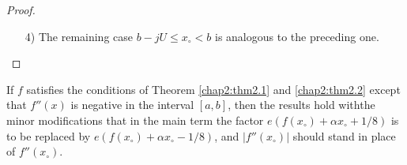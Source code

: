 \begin{proof}
\begin{enumerate}
Since\pageoriginale by \eqref{chap2:eq2.1.29}, \eqref{chap2:eq2.1.10},
and (iv)
\begin{align*}
& U^{-J}\int\limits_{-v}^v\left(U^J+|y|^J\right)|y|^\nu\exp\left(-2\pi
f''(x_\circ)y^2\right)\,dy\\
& \ll f''(x_\circ)^{-(\nu+1)/2}+U^{-J}f''(x_\circ)^{-(\nu+J+1)/2}\\
& \ll \mu(x_\circ)^{\nu+1}F(x_\circ)^{-(\nu+1)/2}
\end{align*}
the contribution of the error terms in \eqref{chap2:eq2.1.31} to $K_2$
is $\ll G(x_\circ)\break\mu(x_\circ)$ $F(x_\circ)^{-1}$. Hence
{\fontsize{10}{12}\selectfont
\begin{align*}
K_2 &= \sqrt{2}g(x_\circ)e(f(x_\circ)+\alpha x_\circ+1/8)U^{-J}
\int\limits_{-v}^v \left(x_\circ-a-jU+(1+i)y\right)^J\\
& \quad\exp\left(-2\pi f''(x_\circ)y^2\right)\,dy
+o\left(G(x_\circ)\mu(x_\circ)F(x_\circ)^{-1}\right)\\ 
&= \sqrt{2}g(x_\circ)e\left(f(x_\circ)+\alpha x_\circ+1/8\right)U^{-J}
\sum\limits_{0\leq\nu\leq J/2}(x_\circ-a-jU)^{J-2\nu}\times\\
&\qquad \times (1+i)^{2\nu}\binom{J}{2\nu}\int\limits_{-v}^vy^{2\nu}\exp
\left(-2\pi f''(x_\circ)y^2\right)\,dy\\
& \qquad +o\left(G(x_\circ)\mu(x_\circ) F(x_\circ)^{-1}\right). 
\end{align*}}

As before, the integrals here can be extended to the whole real line
with a negligible error. Then, evaluating the new integrals by
\eqref{chap2:eq2.1.29} we find that with 
$$
c_\nu=2^{-\nu}\pi^{-\nu-1/2}(1+i)^{2\nu}\binom{J}{2\nu}d_\nu
$$
and with $\xi(x_\circ)$ as in \eqref{chap2:eq2.1.13}, the resulting
expression for $I_J$ is as in \eqref{chap2:eq2.1.11}.
\item [4)] The remaining case $b-jU\leq x_\circ <b$ is analogous to
  the preceding one.
\end{enumerate}
\end{proof}

\begin{remark*}
If $f$ satisfies the conditions of Theorem \ref{chap2:thm2.1} and
\ref{chap2:thm2.2} except that $f''(x)$ is negative in the interval
$[a,b]$, then the results hold with\pageoriginale the minor
modifications that in the main term the factor $e(f(x_\circ)+\alpha
x_\circ +1/8)$ is to be replaced by $e(f(x_\circ)+\alpha x_\circ
-1/8)$, and $|f''(x_\circ)|$ should stand in place of $f''(x_\circ)$. 
\end{remark*}

